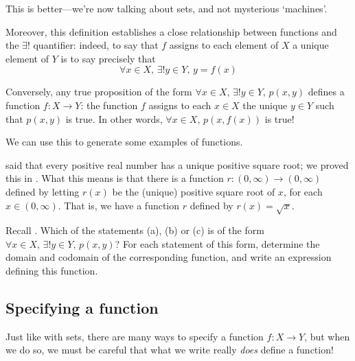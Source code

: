 This is better---we're now talking about sets, and not mysterious `machines'.

Moreover, this definition establishes a close relationship between functions and the $\exists !$ quantifier: indeed, to say that $f$ assigns to each element of $X$ a unique element of $Y$ is to say precisely that
\[ \forall x \in X,\, \exists ! y \in Y,\, y = f(x) \]

Conversely, any true proposition of the form $\forall x \in X,\, \exists ! y \in Y,\, p(x,y)$ defines a function $f : X \to Y$: the function $f$ assigns to each $x \in X$ the unique $y \in Y$ such that $p(x,y)$ is true. In other words, $\forall x \in X,\, p(x,f(x))$ is true!

We can use this to generate some examples of functions.

\begin{example}
\label{exPositiveSquareRootFunction}
 said that every positive real number has a unique positive square root; we proved this in . What this means is that there is a function $r : (0, \infty) \to (0, \infty)$ defined by letting $r(x)$ be the (unique) positive square root of $x$, for each $x \in (0,\infty)$. That is, we have a function $r$ defined by $r(x)=\sqrt{x}$.
\end{example}

\begin{exercise}
Recall . Which of the statements (a), (b) or (c) is of the form $\forall x \in X,\, \exists ! y \in Y,\, p(x,y)$? For each statement of this form, determine the domain and codomain of the corresponding function, and write an expression defining this function.
\end{exercise}

\subsection*{Specifying a function}

Just like with sets, there are many ways to specify a function $f : X \to Y$, but when we do so, we must be careful that what we write really \textit{does} define a function!


